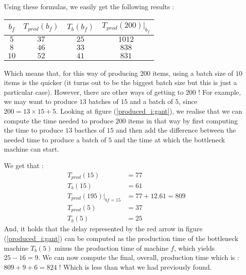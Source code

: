 Using these formulas, we easily get the following results : \begin{center}
    \begin{tabular}{|c|c|c|c|}
        \hline
        $b_f$ & $T_{prod}(b_f)$ & $T_b(b_f)$ & $T_{prod}(200)|_{b_f}$\\\hline
        $5$ & $37$ & $25$ & $1012$ \\\hline
        $8$ & $46$ & $33$ & $838$ \\\hline
        $10$ & $52$ & $41$ & $831$ \\\hline
    \end{tabular}
\end{center} Which means that, for this way of producing $200$ items, using a batch size of $10$ items is the quicker (it turns out to be the biggest batch size but this is just a particular case). However, there are other ways of getting to $200$ ! For example, we may want to produce $13$ batches of $15$ and a batch of $5$, since $200 = 13\times 15 + 5$. Looking at figure (\ref{produced_i:gant}), we realise that we can compute the time needed to produce $200$ items in that way by first computing the time to produce $13$ bacthes of $15$ and then add the difference between the needed time to produce a batch of $5$ and the time at which the bottleneck machine can start.

We get that : \[
    \begin{split}
        T_{prod}(15) &= 77\\
        T_b(15) &= 61\\
        T_{prod}(195)|_{bf=15} &= 77 + 12.61 = 809\\
        T_{prod}(5) &= 37\\
        T_b(5) &= 25
    \end{split}
\] And, it holds that the delay represented by the red arrow in figure (\ref{produced_i:gant}) can be computed as the production time of the bottleneck machine $T_b(5)$ minus the production time of machine $f$, which yields $25 - 16 = 9$. We can now compute the final, overall, production time which is : $809 + 9 + 6 = 824$ ! Which is less than what we had previously found. 

